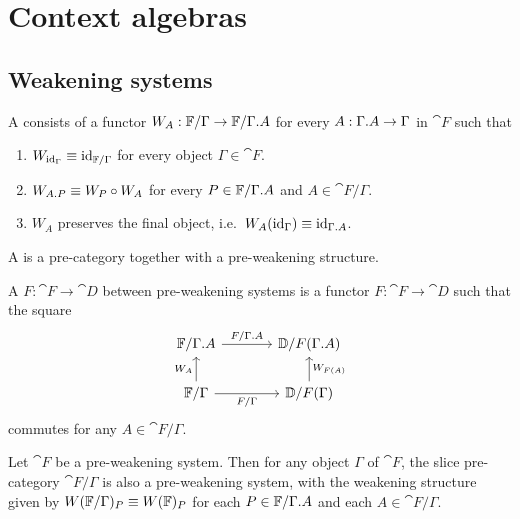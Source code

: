 \section{Context algebras}\label{sec:esys_defn}

\subsection{Weakening systems}

\begin{defn}
A  consists of a functor
$W_A:\cat{F}/\Gamma\to \cat{F}/\ctxext{\Gamma}{A}$ for every $A:\ctxext{\Gamma}{A}\to \Gamma$ in $\cat{F}$ such 
that
\begin{enumerate}
\item $W_{{\mathrm{id}_{\Gamma}}}\equiv {\mathrm{id}_{\mathbb{F}/\Gamma}}$ for every object $\Gamma\in\cat{F}$.
\item $W_{\ctxext{A}{P}}\jdeq W_P\circ W_A$ for every $P\in\cat{F}/\ctxext{\Gamma}{A}$ and $A\in\cat{F}/\Gamma$.
\item $W_A$ preserves the final object, i.e.~$W_A(\catid{\Gamma})\jdeq \catid{\ctxext{\Gamma}{A}}$.
\end{enumerate}
A  is a pre-category together with a pre-weakening structure.
\end{defn}

\begin{defn}
A  $F:\cat{F}\to\cat{D}$ between pre-weakening systems
is a functor $F:\cat{F}\to\cat{D}$ such that the square
\begin{equation*}
\begin{tikzcd}[column sep=large]
\cat{F}/\ctxext{\Gamma}{A}
  \arrow[r,"F/\ctxext{\Gamma}{A}"]
  &
\cat{D}/F(\ctxext{\Gamma}{A})
  \\
\cat{F}/\Gamma
  \arrow[u,"W_A"]
  \arrow[r,swap,"F/\Gamma"]
  &
\cat{D}/F(\Gamma)
  \arrow[u,swap,"W_{F(A)}"]
\end{tikzcd}
\end{equation*}
commutes for any $A\in\cat{F}/\Gamma$.
\end{defn}

\begin{lem}
Let $\cat{F}$ be a pre-weakening system. Then for any object $\Gamma$ of $\cat{F}$,
the slice pre-category $\cat{F}/\Gamma$ is also a pre-weakening system, with the weakening
structure given by $W(\mathbb{F}/\Gamma)_P\equiv W(\mathbb{F})_P$ for each $P\in\cat{F}/\ctxext{\Gamma}{A}$
and each $A\in\cat{F}/\Gamma$.
\end{lem}

